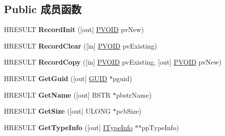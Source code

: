 \subsection*{Public 成员函数}
\begin{DoxyCompactItemize}
\item 
\mbox{\label{interface_i_record_info_a4f64025ca8397a0557f2c5fbb0caa028}} 
H\+R\+E\+S\+U\+LT {\bfseries Record\+Init} (\mbox{[}out\mbox{]} \hyperlink{interfacevoid}{P\+V\+O\+ID} pv\+New)
\item 
\mbox{\label{interface_i_record_info_a2e4198e82231b6184af4916591d000e8}} 
H\+R\+E\+S\+U\+LT {\bfseries Record\+Clear} (\mbox{[}in\mbox{]} \hyperlink{interfacevoid}{P\+V\+O\+ID} pv\+Existing)
\item 
\mbox{\label{interface_i_record_info_a049d4a30504ce68e9312dfdd57ab13ea}} 
H\+R\+E\+S\+U\+LT {\bfseries Record\+Copy} (\mbox{[}in\mbox{]} \hyperlink{interfacevoid}{P\+V\+O\+ID} pv\+Existing, \mbox{[}out\mbox{]} \hyperlink{interfacevoid}{P\+V\+O\+ID} pv\+New)
\item 
\mbox{\label{interface_i_record_info_a7aefb7d630c6a33121f4ae68a94eab53}} 
H\+R\+E\+S\+U\+LT {\bfseries Get\+Guid} (\mbox{[}out\mbox{]} \hyperlink{interface_g_u_i_d}{G\+U\+ID} $\ast$pguid)
\item 
\mbox{\label{interface_i_record_info_ad7d17a13a26904497fbe20348298df8a}} 
H\+R\+E\+S\+U\+LT {\bfseries Get\+Name} (\mbox{[}out\mbox{]} B\+S\+TR $\ast$pbstr\+Name)
\item 
\mbox{\label{interface_i_record_info_ae3bf26b0476e9604d26642968a04da23}} 
H\+R\+E\+S\+U\+LT {\bfseries Get\+Size} (\mbox{[}out\mbox{]} U\+L\+O\+NG $\ast$pcb\+Size)
\item 
\mbox{\label{interface_i_record_info_aaa41772e585133c8ace6fa6b78450f1b}} 
H\+R\+E\+S\+U\+LT {\bfseries Get\+Type\+Info} (\mbox{[}out\mbox{]} \hyperlink{interface_i_type_info}{I\+Type\+Info} $\ast$$\ast$pp\+Type\+Info)
\item 
\mbox{\label{interface_i_record_info_a62b33aa1421763244bc7e4767465dfdc}} 
$$
\end{DoxyCompactItemize}

